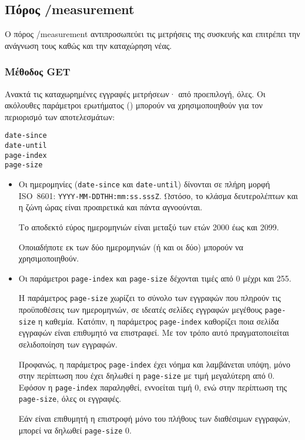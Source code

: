 \subsection{Πόρος /measurement}

Ο πόρος /measurement αντιπροσωπεύει τις μετρήσεις της συσκευής και επιτρέπει
την ανάγνωση τους καθώς και την καταχώρηση νέας.


\subsubsection{Μέθοδος GET}

Ανακτά τις καταχωρημένες εγγραφές μετρήσεων· από προεπιλογή, όλες. Οι ακόλουθες
παράμετροι ερωτήματος () μπορούν να χρησιμοποιηθούν για τον
περιορισμό των αποτελεσμάτων:
\begin{lstlisting}
date-since
date-until
page-index
page-size
\end{lstlisting}
\begin{itemize}
    \item Οι ημερομηνίες (\verb~date-since~ και \verb~date-until~) δίνονται σε
    πλήρη μορφή ISO~8601: \verb~YYYY-MM-DDTHH:mm:ss.sssZ~. Ωστόσο, το κλάσμα
    δευτερολέπτων και η ζώνη ώρας είναι προαιρετικά και πάντα αγνοούνται.

    Το αποδεκτό εύρος ημερομηνιών είναι μεταξύ των ετών 2000 έως και 2099.

    Οποιαδήποτε εκ των δύο ημερομηνιών (ή και οι δύο) μπορούν να
    χρησιμοποιηθούν.

    \item Οι παράμετροι \verb~page-index~ και \verb~page-size~ δέχονται τιμές
    από 0 μέχρι και 255.

    Η παράμετρος \verb~page-size~ χωρίζει το σύνολο των εγγραφών που πληρούν
    τις προϋποθέσεις των ημερομηνιών, σε ιδεατές σελίδες εγγραφών μεγέθους
    \verb~page-size~ η καθεμία. Κατόπιν, η παράμετρος \verb~page-index~
    καθορίζει ποια σελίδα εγγραφών είναι επιθυμητό να επιστραφεί. Με τον τρόπο
    αυτό πραγματοποιείται σελιδοποίηση των εγγραφών.

    Προφανώς, η παράμετρος \verb~page-index~ έχει νόημα και λαμβάνεται υπόψη,
    μόνο στην περίπτωση που έχει δηλωθεί η \verb~page-size~ με τιμή μεγαλύτερη
    από 0. Εφόσον η \verb~page-index~ παραληφθεί, εννοείται τιμή 0, ενώ στην
    περίπτωση της \verb~page-size~, όλες οι εγγραφές.

    Εάν είναι επιθυμητή η επιστροφή μόνο του πλήθους των διαθέσιμων εγγραφών,
    μπορεί να δηλωθεί \verb~page-size~ 0.
\end{itemize}

